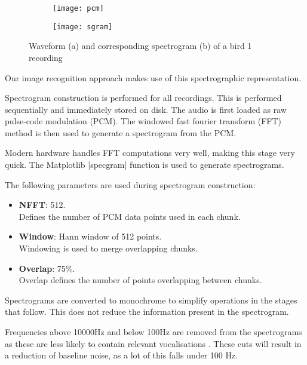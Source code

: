 \begin{figure}[!htb]
  \centering
  \begin{subfigure}[b]{1.0\textwidth}
    \texttt{[image: pcm]}
    \caption{}
  \end{subfigure}
  \begin{subfigure}[b]{1.0\textwidth}
    \texttt{[image: sgram]}
    \caption{}
  \end{subfigure}
  \caption{Waveform (a) and corresponding spectrogram (b) of a bird 1 recording}
  \label{fig:sgram_pcm}
\end{figure}

Our image recognition approach makes use of this spectrographic representation.

Spectrogram construction is performed for all recordings.
This is performed sequentially and immediately stored on disk.
The audio is first loaded as raw pulse-code modulation (PCM).
The windowed fast fourier transform (FFT) method is then used to generate a
spectrogram from the PCM.

Modern hardware handles FFT computations very well, making this stage very quick.
The Matplotlib \parencite{Hunter:2007} |specgram| function is used to generate
spectrograms.

The following parameters are used during spectrogram construction:
\begin{itemize}
  \item \textbf{NFFT}: 512.\\
   Defines the number of PCM data points used in each chunk.
  \item \textbf{Window}: Hann window of 512 points.\\
    Windowing is used to merge overlapping chunks.
  \item \textbf{Overlap}: 75\%.\\
    Overlap defines the number of points overlapping between chunks.
\end{itemize}

Spectrograms are converted to monochrome to simplify operations in the stages
that follow.
This does not reduce the information present in the spectrogram.

Frequencies above 10000Hz and below 100Hz are removed from the spectrograms as
these are less likely to contain relevant vocalisations \parencite{aab}.
These cuts will result in a reduction of baseline noise, as a lot of this falls
under 100 Hz.
